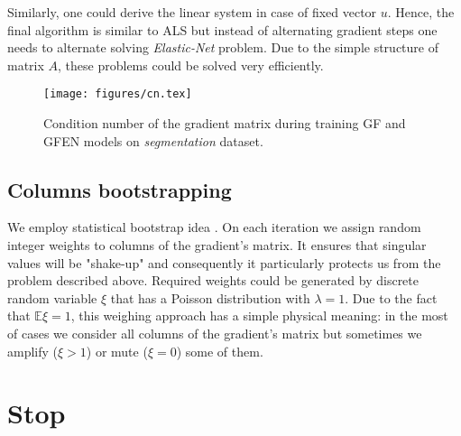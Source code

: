 \documentclass{article}
\begin{document}
Similarly, one could derive the linear system in case of fixed vector $u$. Hence, the final algorithm is similar to ALS but instead of alternating gradient steps one needs to alternate solving \emph{Elastic-Net} problem. Due to the simple structure of matrix $A$, these problems could be solved very efficiently.

\begin{figure}
\vskip 0.2in
\begin{center}
\centerline{\texttt{[image: figures/cn.tex]}}
\caption{Condition number of the gradient matrix during training GF and GFEN models on \emph{segmentation} dataset.}
\end{center}
\vskip -0.2in
\end{figure}

\subsection{Columns bootstrapping}
We employ statistical bootstrap idea \cite{Efron1992bootstrap}. On each iteration we assign random integer weights to columns of the gradient's matrix. It ensures that singular values will be "shake-up" and consequently it particularly protects us from the problem described above. Required weights could be generated by discrete random variable $\xi$ that has a Poisson distribution with $\lambda = 1$. Due to the fact that $\mathbb{E} \xi = 1$, this weighing approach has a simple physical meaning: in the most of cases we consider all columns of the gradient's matrix but sometimes we amplify ($\xi > 1$) or mute ($\xi = 0$) some of them.







\section{Stop}
\end{document}
